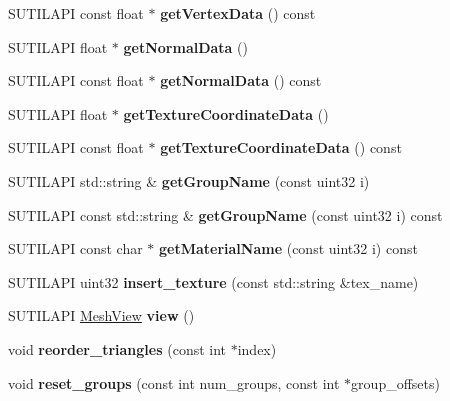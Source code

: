 \begin{DoxyCompactItemize}
S\+U\+T\+I\+L\+A\+PI const float $\ast$ {\bfseries get\+Vertex\+Data} () const
\item 
\mbox{\label{class_mesh_storage_ab0195d352b038ae46910d087d588aa6f}} 
S\+U\+T\+I\+L\+A\+PI float $\ast$ {\bfseries get\+Normal\+Data} ()
\item 
\mbox{\label{class_mesh_storage_a5c97d63355af753a016d7e0886c04c76}} 
S\+U\+T\+I\+L\+A\+PI const float $\ast$ {\bfseries get\+Normal\+Data} () const
\item 
\mbox{\label{class_mesh_storage_a85cf3d134f3dc755f37d61561904c0d2}} 
S\+U\+T\+I\+L\+A\+PI float $\ast$ {\bfseries get\+Texture\+Coordinate\+Data} ()
\item 
\mbox{\label{class_mesh_storage_a61c4b007a1fba002b52fa2dc1fb171a4}} 
S\+U\+T\+I\+L\+A\+PI const float $\ast$ {\bfseries get\+Texture\+Coordinate\+Data} () const
\item 
\mbox{\label{class_mesh_storage_a340297ea20ebad9231f825973a2a86d5}} 
S\+U\+T\+I\+L\+A\+PI std\+::string \& {\bfseries get\+Group\+Name} (const uint32 i)
\item 
\mbox{\label{class_mesh_storage_a37b402692f3b8c0feea707dd3c15dbdb}} 
S\+U\+T\+I\+L\+A\+PI const std\+::string \& {\bfseries get\+Group\+Name} (const uint32 i) const
\item 
\mbox{\label{class_mesh_storage_a63bd6f162262f27ff06ace0150c6f269}} 
S\+U\+T\+I\+L\+A\+PI const char $\ast$ {\bfseries get\+Material\+Name} (const uint32 i) const
\item 
\mbox{\label{class_mesh_storage_ae44c4a1c30fa1c326b568e010e24240d}} 
S\+U\+T\+I\+L\+A\+PI uint32 {\bfseries insert\+\_\+texture} (const std\+::string \&tex\+\_\+name)
\item 
\mbox{\label{class_mesh_storage_a3a1e2a2e159141f17f968b9959d1633d}} 
S\+U\+T\+I\+L\+A\+PI \hyperlink{struct_mesh_view}{Mesh\+View} {\bfseries view} ()
\item 
\mbox{\label{class_mesh_storage_aa0829a5be9b4435fd3e1f39b6ca647d0}} 
void {\bfseries reorder\+\_\+triangles} (const int $\ast$index)
\item 
\mbox{\label{class_mesh_storage_abd5651d50723c558ad0b10e237e3dd37}} 
void {\bfseries reset\+\_\+groups} (const int num\+\_\+groups, const int $\ast$group\+\_\+offsets)
\end{DoxyCompactItemize}
